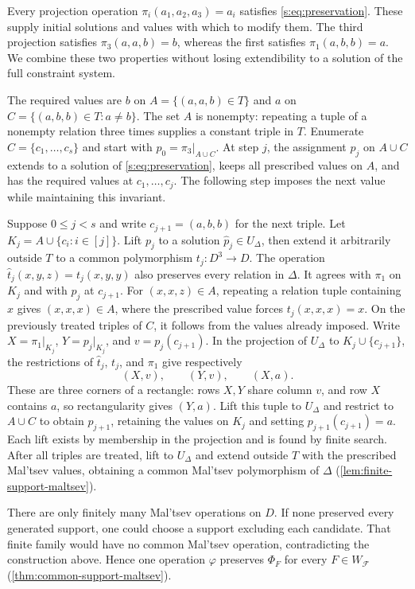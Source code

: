 \documentclass[11pt,letterpaper,onecolumn]{article}
\theoremstyle{plain}
\theoremstyle{definition}
\theoremstyle{remark}
\newcommand{\cF}{\mathcal F}
\newcommand{\SuppRel}[1]{\Phi_{#1}}
\begin{document}
Every projection operation $\pi_i(a_1,a_2,a_3)=a_i$ satisfies
\eqref{s:eq:preservation}. These supply initial solutions and values
with which to modify them. The third projection satisfies
$\pi_3(a,a,b)=b$, whereas the first satisfies $\pi_1(a,b,b)=a$.
We combine these two properties without losing extendibility to a
solution of the full constraint system.

The required values are $b$ on
$A=\{(a,a,b)\in T\}$ and $a$ on
$C=\{(a,b,b)\in T:a\ne b\}$.
The set $A$ is nonempty: repeating a tuple of a nonempty relation
three times supplies a constant triple in $T$.
Enumerate $C=\{c_1,\ldots,c_s\}$ and start with $p_0=\pi_3|_{A\cup C}$.
At step $j$, the assignment $p_j$ on $A\cup C$ extends to a
solution of \eqref{s:eq:preservation}, keeps all prescribed values on
$A$, and has the required values at $c_1,\ldots,c_j$.
The following step imposes the next value while maintaining this
invariant.

Suppose $0\le j<s$ and write $c_{j+1}=(a,b,b)$ for the next triple.
Let $K_j=A\cup\{c_i:i\in[j]\}$. Lift $p_j$ to a solution
$\widehat p_j\in U_\Delta$, then extend it arbitrarily outside $T$
to a common polymorphism $t_j:D^3\to D$.
The operation $\widehat t_j(x,y,z)=t_j(x,y,y)$ also preserves every
relation in $\Delta$. It agrees with $\pi_1$ on $K_j$ and with $p_j$
at $c_{j+1}$. For $(x,x,z)\in A$, repeating a relation tuple containing
$x$ gives $(x,x,x)\in A$, where the prescribed value forces
$t_j(x,x,x)=x$.
On the previously treated triples of $C$, it follows from the
values already imposed. Write $X=\pi_1|_{K_j}$, $Y=p_j|_{K_j}$,
and $v=p_j(c_{j+1})$.
In the projection of $U_\Delta$ to $K_j\cup\{c_{j+1}\}$, the restrictions
of $\widehat t_j$, $t_j$, and $\pi_1$ give respectively
\[
 (X,v),\qquad(Y,v),\qquad(X,a).
\]
These are three corners of a rectangle: rows $X,Y$ share column $v$,
and row $X$ contains $a$, so rectangularity gives $(Y,a)$. Lift this
tuple to $U_\Delta$ and restrict to $A\cup C$ to obtain $p_{j+1}$,
retaining the values on $K_j$ and setting $p_{j+1}(c_{j+1})=a$.
Each lift exists by membership in the projection and is found by finite
search. After all triples are treated, lift to $U_\Delta$ and extend
outside $T$ with the prescribed Mal'tsev values, obtaining a common
Mal'tsev polymorphism of $\Delta$ (\cref{lem:finite-support-maltsev}).

There are only finitely many Mal'tsev operations on $D$. If none
preserved every generated support, one could choose a support excluding
each candidate. That finite family would have no common Mal'tsev
operation, contradicting the construction above. Hence one operation
$\varphi$ preserves $\SuppRel F$ for every $F\in W_{\cF}$
(\cref{thm:common-support-maltsev}).
\end{document}
